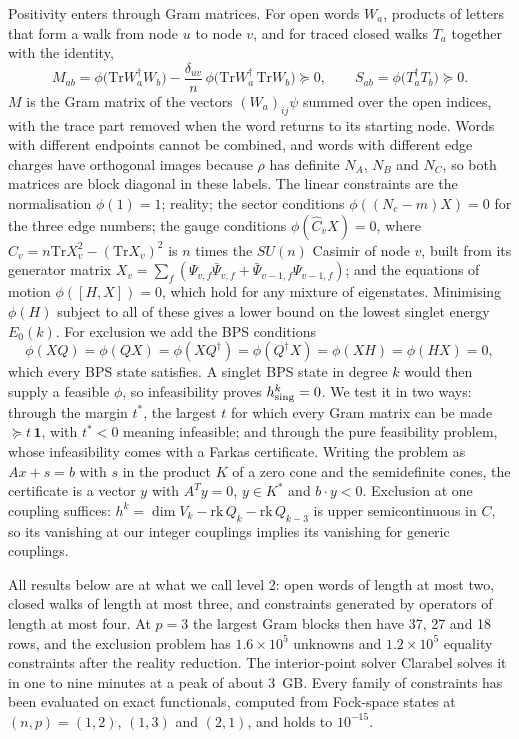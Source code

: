 \documentclass[10pt]{article}
\newcommand{\Tr}{\mathrm{Tr}}
\newcommand{\bQ}{Q^\dagger}
\begin{document}
Positivity enters through Gram matrices. For open words $W_a$, products of letters that form a walk from node $u$ to
node $v$, and for traced closed walks $T_a$ together with the identity,
\begin{equation}
M_{ab}=\phi\big(\Tr W_a^\dagger W_b\big)-\frac{\delta_{uv}}{n}\,\phi\big(\Tr W_a^\dagger\,\Tr W_b\big)\succeq0,\qquad
S_{ab}=\phi\big(T_a^\dagger T_b\big)\succeq0 .
\label{eq:cones}
\end{equation}
$M$ is the Gram matrix of the vectors $(W_a)_{ij}\psi$ summed over the open indices, with the trace part removed when
the word returns to its starting node. Words with different endpoints cannot be combined, and words with different
edge charges have orthogonal images because $\rho$ has definite $N_A$, $N_B$ and $N_C$, so both matrices are block
diagonal in these labels. The linear constraints are the normalisation $\phi(1)=1$; reality; the sector conditions
$\phi((N_e-m)X)=0$ for the three edge numbers; the gauge conditions $\phi(\hat C_vX)=0$, where
$\hat C_v=n\Tr X_v^2-(\Tr X_v)^2$ is $n$ times the $SU(n)$ Casimir of node $v$, built from its generator matrix
$X_v=\sum_f(\Psi_{v,f}\bar\Psi_{v,f}+\bar\Psi_{v-1,f}\Psi_{v-1,f})$; and the equations of motion $\phi([H,X])=0$,
which hold for any mixture of eigenstates. Minimising $\phi(H)$ subject to all of these gives a lower bound on the
lowest singlet energy $E_0(k)$. For exclusion we add the BPS conditions
\begin{equation}
\phi(XQ)=\phi(QX)=\phi(X\bQ)=\phi(\bQ X)=\phi(XH)=\phi(HX)=0 ,
\label{eq:bpsrows}
\end{equation}
which every BPS state satisfies. A singlet BPS state in degree $k$ would then supply a feasible $\phi$, so
infeasibility proves $h^k_{\rm sing}=0$. We test it in two ways: through the margin $t^*$, the largest $t$ for which
every Gram matrix can be made $\succeq t\,\mathbf 1$, with $t^*<0$ meaning infeasible; and through the pure feasibility
problem, whose infeasibility comes with a Farkas certificate. Writing the problem as $Ax+s=b$ with $s$ in the product
$K$ of a zero cone and the semidefinite cones, the certificate is a vector $y$ with $A^Ty=0$, $y\in K^*$ and
$b\cdot y<0$. Exclusion at one coupling suffices: $h^k=\dim V_k-\mathrm{rk}\,Q_k-\mathrm{rk}\,Q_{k-3}$ is upper
semicontinuous in $C$, so its vanishing at our integer couplings implies its vanishing for generic couplings.

All results below are at what we call level 2: open words of length at most two, closed walks of length at most
three, and constraints generated by operators of length at most four. At $p=3$ the largest Gram blocks then have 37,
27 and 18 rows, and the exclusion problem has $1.6\times10^5$ unknowns and $1.2\times10^5$ equality constraints after
the reality reduction. The interior-point solver Clarabel solves it in one to nine minutes at a peak of about 3~GB.
Every family of constraints has been evaluated on exact functionals, computed from Fock-space states at
$(n,p)=(1,2)$, $(1,3)$ and $(2,1)$, and holds to $10^{-15}$.
\end{document}
